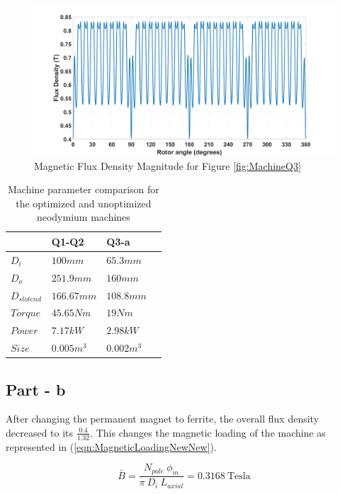 \documentclass{article}
\begin{document}
\begin{figure}[h!]
\centering
\includegraphics[scale=0.15]{Figures/MagBQ3.png}
\caption{Magnetic Flux Density Magnitude for Figure \ref{fig:MachineQ3}}
\label{fig:MagBQ3}
\end{figure}

\begin{table}[h!] 
\begin{center}
\caption{Machine parameter comparison for the optimized and unoptimized neodymium machines}
\label{table:Comparison}
\begin{tabular}{ |p{3cm}||p{3cm}|p{3cm}|p{3cm}|  }
 \hline
    & Q1-Q2	& Q3-a\\
 \hline
 $D_i$	& $100mm$	&	$65.3mm$\\
 \hline
 $D_o$ &	$251.9mm$	& $160mm$\\
 \hline
 $D_{slotend}$ &$166.67mm$	& $108.8mm$\\
 \hline
  $Torque$ &$45.65Nm$	& $19Nm$\\
 \hline
  $Power$ &$7.17kW$	& $2.98kW$\\
 \hline
  $Size$ &$0.005m^3$	& $0.002m^3$\\
 \hline
\end{tabular}
\end{center}
\end{table}

\subsection{Part - b}
After changing the permanent magnet to ferrite, the overall flux density decreased to its $\frac{0.4}{1.32}$. This changes the magnetic loading of the machine as represented in (\ref{eqn:MagneticLoadingNewNew}). 

\begin{equation} \label{eqn:MagneticLoadingNewNew}
    \bar{B} = \frac{N_{pole}\:\phi_{m}}{\pi \: D_i \: L_{axial}} = 0.3168 \: \mathrm{Tesla}
\end{equation}
\end{document}
